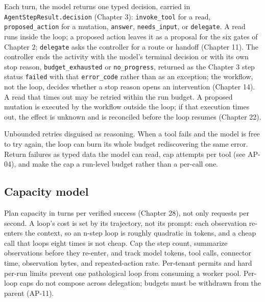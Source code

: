 Each turn, the model returns one typed decision, carried in \lstinline[style=bookinline]!AgentStepResult.decision! (Chapter 3): \lstinline[style=bookinline]!invoke_tool! for a read, \lstinline[style=bookinline]!proposed_action! for a mutation, \lstinline[style=bookinline]!answer!, \lstinline[style=bookinline]!needs_input!, or \lstinline[style=bookinline]!delegate!. A read runs inside the loop; a proposed action leaves it as a proposal for the six gates of Chapter 2; \lstinline[style=bookinline]!delegate! asks the controller for a route or handoff (Chapter 11). The controller ends the activity with the model's terminal decision or with its own stop reason, \lstinline[style=bookinline]!budget_exhausted! or \lstinline[style=bookinline]!no_progress!, returned as the Chapter 3 step status \lstinline[style=bookinline]!failed! with that \lstinline[style=bookinline]!error_code! rather than as an exception; the workflow, not the loop, decides whether a stop reason opens an intervention (Chapter 14). A read that times out may be retried within the run budget. A proposed mutation is executed by the workflow outside the loop; if that execution times out, the effect is unknown and is reconciled before the loop resumes (Chapter 22).\par

\begin{bookantipattern}
Unbounded retries disguised as reasoning. When a tool fails and the model is free to try again, the loop can burn its whole budget rediscovering the same error. Return failures as typed data the model can read, cap attempts per tool (see AP-04), and make the cap a run-level budget rather than a per-call one.
\end{bookantipattern}

\subsection{Capacity model}

Plan capacity in turns per verified success (Chapter 28), not only requests per second. A loop's cost is set by its trajectory, not its prompt: each observation re-enters the context, so an n-step loop is roughly quadratic in tokens, and a cheap call that loops eight times is not cheap. Cap the step count, summarize observations before they re-enter, and track model tokens, tool calls, connector time, observation bytes, and repeated-action rate. Per-tenant permits and hard per-run limits prevent one pathological loop from consuming a worker pool. Per-loop caps do not compose across delegation; budgets must be withdrawn from the parent (AP-11).\par

